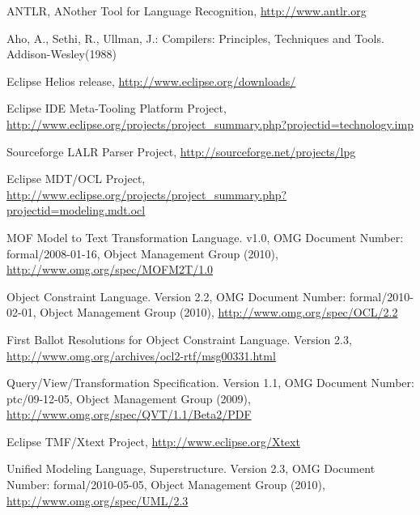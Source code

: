 \documentclass[runningheads,a4paper]{llncs}
\begin{document}
\begin{thebibliography}{4}

 ANTLR, ANother Tool for Language Recognition,  \url{http://www.antlr.org}

 Aho, A., Sethi, R., Ullman, J.: Compilers: Principles, Techniques and Tools. Addison-Wesley(1988) 

 Eclipse Helios release,  \url{http://www.eclipse.org/downloads/}

 Eclipse IDE Meta-Tooling Platform Project,  \url{http://www.eclipse.org/projects/project_summary.php?projectid=technology.imp}

 Sourceforge LALR Parser Project,  \url{http://sourceforge.net/projects/lpg}

 Eclipse MDT/OCL Project,  \url{http://www.eclipse.org/projects/project_summary.php?projectid=modeling.mdt.ocl}

 MOF Model to Text Transformation Language. v1.0, OMG Document Number: formal/2008-01-16, Object Management Group (2010),  \url{http://www.omg.org/spec/MOFM2T/1.0}

 Object Constraint Language. Version 2.2, OMG Document Number: formal/2010-02-01, Object Management Group (2010),  \url{http://www.omg.org/spec/OCL/2.2}

 First Ballot Resolutions for Object Constraint Language. Version 2.3,  \url{http://www.omg.org/archives/ocl2-rtf/msg00331.html}

 Query/View/Transformation Specification. Version 1.1, OMG Document Number: ptc/09-12-05, Object Management Group (2009),  \url{http://www.omg.org/spec/QVT/1.1/Beta2/PDF}

 Eclipse TMF/Xtext Project,  \url{http://www.eclipse.org/Xtext}

 Unified Modeling Language, Superstructure. Version 2.3, OMG Document Number: formal/2010-05-05, Object Management Group (2010),  \url{http://www.omg.org/spec/UML/2.3}

\end{thebibliography}
\end{document}
